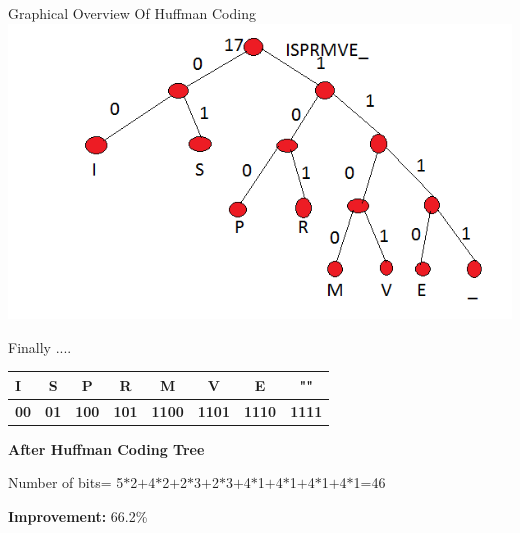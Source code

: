 \documentclass[12pt]{beamer}
\begin{document}
\begin{frame}{Graphical Overview Of Huffman Coding}
\includegraphics[scale=0.6]{7}
\end{frame}



\begin{frame} {Finally .... }

	

	\pause
     
     \begin{table}[bt]
	\begin{tabular}{|l|c|c|c|c|c|c|c|} \hline 
	\textbf{I} & \textbf{S} & \textbf{P} & \textbf{R} & \textbf{M} & \textbf{V} & \textbf{E} &\textbf{""} \\ \hline
	
	\textbf{00} & \textbf{01} & \textbf{100} & \textbf{101} & \textbf{1100} & \textbf{1101} & \textbf{1110} &\textbf{1111} \\ \hline
	\end{tabular}
\end{table}	
	

\end{frame}


\begin{frame}
      {\color{red}\textbf{After Huffman Coding Tree}}
	  \pause
	  
	 Number of bits= 5$*$2$+$4$*$2$+$2$*$3$+$2$*$3$+$4$*$1$+$4$*$1$+$4$*$1$+$4$*$1=46\\ 	  
	 
	 
	 \pause
	 
	 \textbf{\color{blue} Improvement:} 66.2\%  
	        
\end{frame}
\end{document}
